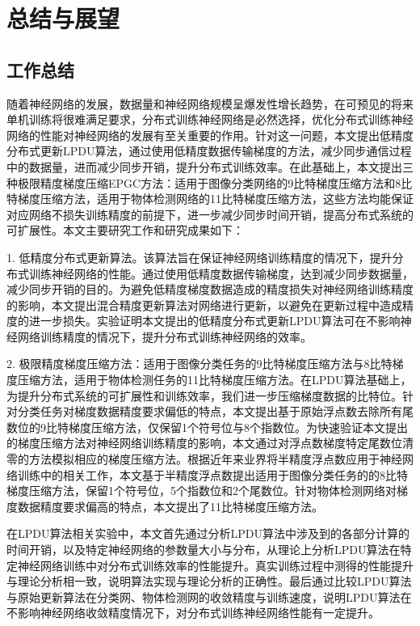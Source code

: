 \chapter{总结与展望}
\section{工作总结}
随着神经网络的发展，数据量和神经网络规模呈爆发性增长趋势，在可预见的将来单机训练将很难满足要求，分布式训练神经网络是必然选择，优化分布式训练神经网络的性能对神经网络的发展有至关重要的作用。针对这一问题，本文提出低精度分布式更新LPDU算法，通过使用低精度数据传输梯度的方法，减少同步通信过程中的数据量，进而减少同步开销，提升分布式训练效率。在此基础上，本文提出三种极限精度梯度压缩EPGC方法：适用于图像分类网络的9比特梯度压缩方法和8比特梯度压缩方法，适用于物体检测网络的11比特梯度压缩方法，这些方法均能保证对应网络不损失训练精度的前提下，进一步减少同步时间开销，提高分布式系统的可扩展性。本文主要研究工作和研究成果如下：

1. 低精度分布式更新算法。该算法旨在保证神经网络训练精度的情况下，提升分布式训练神经网络的性能。通过使用低精度数据传输梯度，达到减少同步数据量，减少同步开销的目的。为避免低精度梯度数据造成的精度损失对神经网络训练精度的影响，本文提出混合精度更新算法对网络进行更新，以避免在更新过程中造成精度的进一步损失。实验证明本文提出的低精度分布式更新LPDU算法可在不影响神经网络训练精度的情况下，提升分布式训练神经网络的效率。

2. 极限精度梯度压缩方法：适用于图像分类任务的9比特梯度压缩方法与8比特梯度压缩方法，适用于物体检测任务的11比特梯度压缩方法。在LPDU算法基础上，为提升分布式系统的可扩展性和训练效率，我们进一步压缩梯度数据的比特位。针对分类任务对梯度数据精度要求偏低的特点，本文提出基于原始浮点数去除所有尾数位的9比特梯度压缩方法，仅保留1个符号位与8个指数位。为快速验证本文提出的梯度压缩方法对神经网络训练精度的影响，本文通过对浮点数梯度特定尾数位清零的方法模拟相应的梯度压缩方法。根据近年来业界将半精度浮点数应用于神经网络训练中的相关工作，本文基于半精度浮点数提出适用于图像分类任务的的8比特梯度压缩方法，保留1个符号位，5个指数位和2个尾数位。针对物体检测网络对梯度数据精度要求偏高的特点，本文提出了11比特梯度压缩方法。

在LPDU算法相关实验中，本文首先通过分析LPDU算法中涉及到的各部分计算的时间开销，以及特定神经网络的参数量大小与分布，从理论上分析LPDU算法在特定神经网络训练中对分布式训练效率的性能提升。真实训练过程中测得的性能提升与理论分析相一致，说明算法实现与理论分析的正确性。最后通过比较LPDU算法与原始更新算法在分类网、物体检测网的收敛精度与训练速度，说明LPDU算法在不影响神经网络收敛精度情况下，对分布式训练神经网络性能有一定提升。

